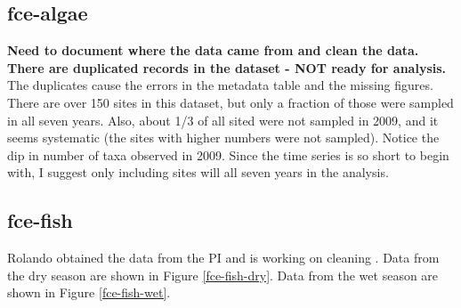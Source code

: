 \documentclass[11pt, oneside]{article}
\begin{document}
\subsection {fce-algae}
{\bf Need to document where the data came from and clean the data.}
{\bf There are duplicated records in the dataset - NOT ready for analysis.}
The duplicates cause the errors in the metadata table and the missing figures.
There are over 150 sites in this dataset, but only a fraction of those were sampled in all seven years.
Also, about 1/3 of all sited were not sampled in 2009, and it seems systematic (the sites with higher numbers were not sampled).
Notice the dip in number of taxa observed in 2009.
Since the time series is so short to begin with, I suggest only including sites will all seven years in the analysis.


\subsection {fce-fish}
Rolando obtained the data from the PI and is working on cleaning \citep{fce-fish}.
Data from the dry season are shown in Figure \ref{fce-fish-dry}.
Data from the wet season are shown in Figure \ref{fce-fish-wet}.
\end{document}
